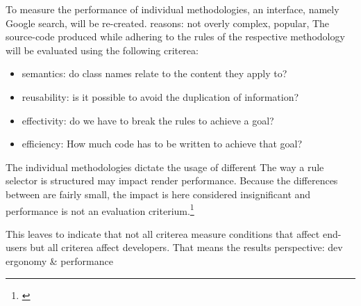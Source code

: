 To measure the performance of individual methodologies, an interface, namely Google search, will be re-created.
reasons: not overly complex, popular, 
The source-code produced while adhering to the rules of the respective methodology will be evaluated using the following criterea:
\begin{itemize}
    \item semantics: do class names relate to the content they apply to?
    \item reusability: is it possible to avoid the duplication of information?
    \item effectivity: do we have to break the rules to achieve a goal?
    \item efficiency: How much code has to be written to achieve that goal?
\end{itemize}


The individual methodologies dictate the usage of different 
The way a rule selector is structured may impact render performance. 
Because the differences between are fairly small, the impact is here considered insignificant and performance is not an evaluation criterium.\footnote{\cite{selectorperformance}}

This leaves to indicate that not all criterea measure conditions that affect end-users but all criterea affect developers.
That means the results
perspective:
dev ergonomy \& performance
%  

